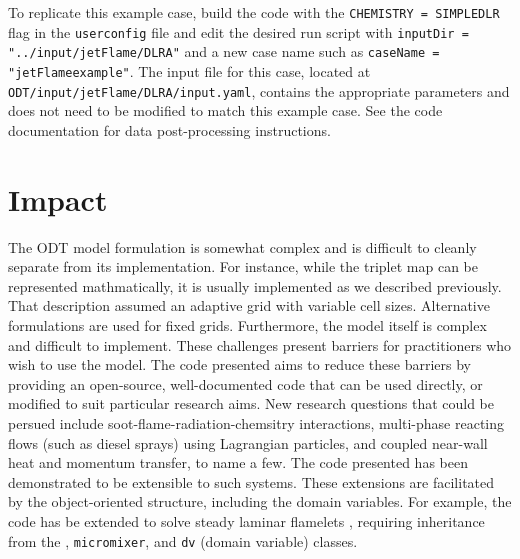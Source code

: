 \documentclass[preprint,12pt, a4paper]{elsarticle}
\begin{document}
To replicate this example case, build the code with the \texttt{CHEMISTRY = SIMPLEDLR} flag in the \texttt{user\textunderscore config} file and edit the desired run script with \texttt{inputDir = "../input/jetFlame/DLR\textunderscore A"} and a new case name such as \texttt{caseName = "jetFlame\textunderscore example"}. The input file for this case, located at \texttt{ODT/input/jetFlame/DLR\textunderscore A/input.yaml}, contains the appropriate parameters and does not need to be modified to match this example case. See the code documentation for data post-processing instructions.


\section{Impact}
\label{sec:impact}

The ODT model formulation is somewhat complex and is difficult to cleanly separate from its implementation. For instance, while the triplet map can be represented mathmatically, it is usually implemented as we described previously. That description assumed an adaptive grid with variable cell sizes. Alternative formulations are used for fixed grids. Furthermore, the model itself is complex and difficult to implement. These challenges present barriers for practitioners who wish to use the model. The code presented aims to reduce these barriers by providing an open-source, well-documented code that can be used directly, or modified to suit particular research aims. New research questions that could be persued include soot-flame-radiation-chemsitry interactions, multi-phase reacting flows (such as diesel sprays) using Lagrangian particles, and coupled near-wall heat and momentum transfer, to name a few. The code presented has been demonstrated to be extensible to such systems. These extensions are facilitated by the object-oriented structure, including the domain variables. For example, the code has be extended to solve steady laminar flamelets \cite{Peters_1984}, requiring inheritance from the , \texttt{micromixer}, and \texttt{dv} (domain variable) classes.
\end{document}
